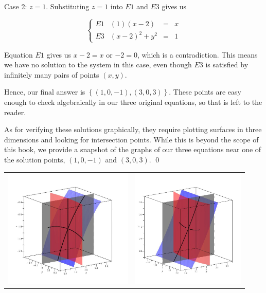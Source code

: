 \begin{ex}
\begin{enumerate}
{ \sc Case 2:  $z = 1$. }  Substituting $z=1$ into $E1$ and $E3$ gives us 


\[\left\{\begin{array}{lrcl}   E1 & (1)(x-2) & = & x  \\ E3 & (x-2)^2+y^2 & = & 1 \end{array} \right.\]

Equation $E1$ gives us $x-2 = x$ or $-2 = 0$, which is a contradiction.  This means we have no solution to the system in this case, even though $E3$ is satisfied by infinitely many pairs of points $(x,y)$.  

Hence, our final answer is $\left\{ (1,0,-1), (3,0,3) \right\}$.  These points are easy enough to check algebraically in our three original equations, so that is left to the reader.  

As for verifying these solutions graphically, they require plotting surfaces in three dimensions and looking for intersection points.  While this is beyond the scope of this book, we provide a snapshot of the graphs of our three equations near one of the solution points,  $(1,0,-1)$ and $(3,0,3)$. \qed

\begin{center}

\begin{tabular}{cc}

\includegraphics[height=2.25in]{./NonLinearEquationsGraphics/NonLinear03a.jpg}

&

\includegraphics[height=2.25in]{./NonLinearEquationsGraphics/NonLinear03b.jpg} \\


\end{tabular}
\end{center}
\end{enumerate}
\end{ex}
